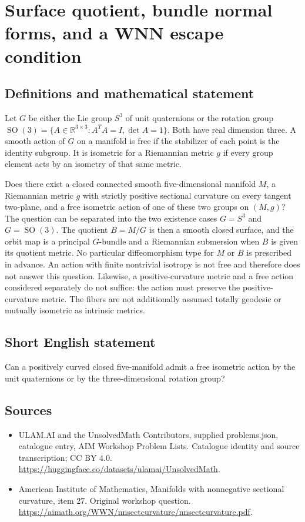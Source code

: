 \documentclass[11pt,a4paper]{article}
\begin{document}
\section*{Surface quotient, bundle normal forms, and a WNN escape condition}\label{statement}

\subsection{Definitions and mathematical statement}
Let $G$ be either the Lie group $S^3$ of unit quaternions or the rotation group
$\operatorname{SO}(3)=\{A\in\mathbb R^{3\times3}:A^TA=I,\det A=1\}$.
Both have real dimension three.
A smooth action of $G$ on a manifold is free if the stabilizer of each point is the identity subgroup.
It is isometric for a Riemannian metric $g$ if every group element acts by an isometry of that same metric.

Does there exist a closed connected smooth five-dimensional manifold $M$, a Riemannian metric $g$ with strictly positive sectional curvature on every tangent two-plane, and a free isometric action of one of these two groups on $(M,g)$?
The question can be separated into the two existence cases $G=S^3$ and $G=\operatorname{SO}(3)$.
The quotient $B=M/G$ is then a smooth closed surface, and the orbit map is a principal $G$-bundle and a Riemannian submersion when $B$ is given its quotient metric.
No particular diffeomorphism type for $M$ or $B$ is prescribed in advance.
An action with finite nontrivial isotropy is not free and therefore does not answer this question.
Likewise, a positive-curvature metric and a free action considered separately do not suffice: the action must preserve the positive-curvature metric.
The fibers are not additionally assumed totally geodesic or mutually isometric as intrinsic metrics.
\subsection{Short English statement}
Can a positively curved closed five-manifold admit a free isometric action by the unit quaternions or by the three-dimensional rotation group?
\subsection{Sources}
\begin{itemize}
\item[S1] ULAM.AI and the UnsolvedMath Contributors, supplied problems.json, catalogue entry, AIM Workshop Problem Lists. Catalogue identity and source transcription; CC BY 4.0.
\url{https://huggingface.co/datasets/ulamai/UnsolvedMath}.
\item[S2] American Institute of Mathematics, Manifolds with nonnegative sectional curvature, item 27. Original workshop question.
\url{https://aimath.org/WWN/nnsectcurvature/nnsectcurvature.pdf}.
\end{itemize}
\end{document}
